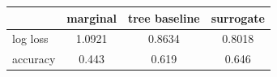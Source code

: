 \begin{tabular}{lccc}
\toprule
 & marginal & tree baseline & surrogate \\
\midrule
log loss & 1.0921 & 0.8634 & 0.8018 \\
accuracy & 0.443 & 0.619 & 0.646 \\
\bottomrule
\end{tabular}
